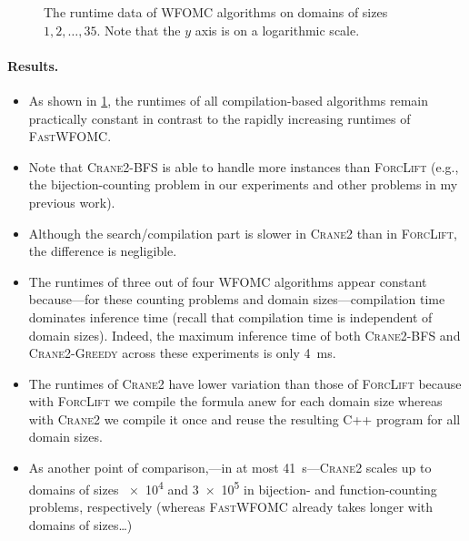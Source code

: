 \documentclass{article}
\theoremstyle{definition}
\newcommand{\Cranetwo}{\textsc{Crane2}}
\newcommand{\Cranebfs}{\textsc{Crane2-BFS}}
\newcommand{\Cranegreedy}{\textsc{Crane2-Greedy}}
\begin{document}
\begin{figure}
  \centering
  
  \caption{The runtime data of WFOMC algorithms on domains of sizes
    $1, 2, \dots, 35$. Note that the $y$ axis is on a logarithmic
    scale.}\label{fig:plot}
\end{figure}

\paragraph{Results.}
\begin{itemize}
  \item As shown in \cref{fig:plot}, the runtimes of all compilation-based
        algorithms remain practically constant in contrast to the rapidly
        increasing runtimes of \textsc{FastWFOMC}.
  \item Note that \Cranebfs{} is able to handle more instances than
        \textsc{ForcLift} (e.g., the bijection-counting problem in our
        experiments and other problems in my previous work).
  \item Although the search/compilation part is slower in \Cranetwo{} than in
        \textsc{ForcLift}, the difference is negligible.
  \item The runtimes of three out of four WFOMC algorithms appear constant
        because---for these counting problems and domain sizes---compilation
        time dominates inference time (recall that compilation time is
        independent of domain sizes). Indeed, the maximum inference time of both
        \Cranebfs{} and \Cranegreedy{} across these experiments is
        only \SI{4}{\milli\second}.
  \item The runtimes of \Cranetwo{} have lower variation than those of
        \textsc{ForcLift} because with \textsc{ForcLift} we compile the formula
        anew for each domain size whereas with \Cranetwo{} we compile it once
        and reuse the resulting C++ program for all domain sizes.
  \item As another point of comparison,---in at most
        \SI{41}{\second}---\Cranetwo{} scales up to domains of sizes \num{e4}
        and \num{3e5} in bijection- and function-counting problems, respectively
        (whereas \textsc{FastWFOMC} already takes longer with domains of
        sizes\dots)
\end{itemize}

\end{document}

